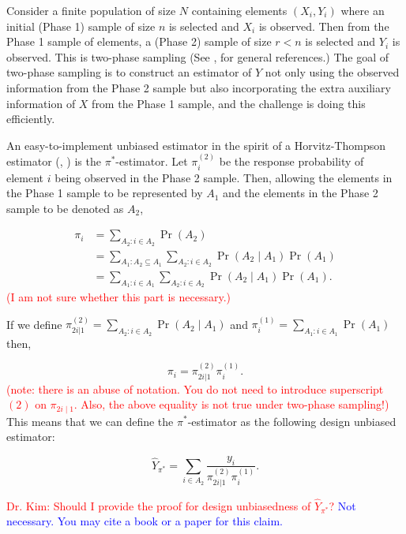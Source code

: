 \documentclass[12pt]{article}
\begin{document}
Consider a finite population of size $N$ containing elements $(X_i, Y_i)$ where
an initial (Phase 1) sample of size $n$ is selected and $X_i$ is observed. Then
from the Phase 1 sample of elements, a (Phase 2) sample of size $r < n$ is
selected and $Y_i$ is observed. This is two-phase sampling (See 
\cite{fuller2009sampling}, \cite{kim2024statistics} for general references.) The
goal of two-phase sampling is to construct an estimator of $Y$ not
only using the observed information from the Phase 2 sample but also
incorporating the extra auxiliary information of $X$ from the Phase 1 sample, and
the challenge is doing this efficiently.

An easy-to-implement unbiased estimator in the spirit of a Horvitz-Thompson
estimator (\cite{horvitz1952generalization}, \cite{narain1951sampling}) is the
$\pi^*$-estimator. Let $\pi_i^{(2)}$ be the response probability of element $i$
being observed in the Phase 2 sample. Then, allowing the elements in the Phase 1
sample to be represented by $A_1$ and the elements in the Phase 2 sample to be
denoted as $A_2$,

\begin{align*}
  \pi_i &= \sum_{A_2: i \in A_2} \Pr(A_2) \\ 
        &= \sum_{A_1: A_2 \subseteq A_1} \sum_{A_2: i \in A_2} \Pr(A_2 \mid
        A_1) \Pr(A_1) \\
        &= \sum_{A_1: i \in A_1} \sum_{A_2: i \in A_2} \Pr(A_2 \mid A_1) \Pr(A_1).
\end{align*}
\textcolor{red}{(I am not sure whether this part is necessary.) }

If we define $\pi_{2i | 1}^{(2)} = \sum_{A_2: i \in A_2} \Pr(A_2 \mid A_1)$ and
$\pi_i^{(1)} = \sum_{A_1: i \in A_1} \Pr(A_1)$ then,

$$ \pi_i = \pi_{2i | 1}^{(2)} \pi_i^{(1)}.$$
\textcolor{red}{(note: there is an abuse of notation. You do not need to introduce superscript $(2)$ on $\pi_{2i \mid 1}$. 
Also, the above equality is not true under two-phase sampling!)  }
This means that we can define the $\pi^*$-estimator as the following design
unbiased estimator:

$$ \hat Y_{\pi^*} = \sum_{i \in A_2} \frac{y_i}{\pi_{2i | 1}^{(2)} \pi_i^{(1)}}.$$

\textcolor{red}{Dr. Kim: Should I provide the proof for design unbiasedness of
$\hat Y_{\pi^*}$? } \textcolor{blue}{Not necessary. You may cite a book or a paper  for this claim. }
\end{document}
